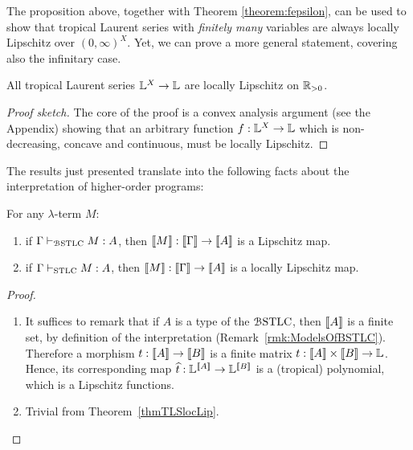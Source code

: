 The proposition above, together with Theorem \ref{theorem:fepsilon}, can be used to show that tropical Laurent series with \emph{finitely many} variables are always locally Lipschitz over $(0,\infty)^{X}$. Yet, we can prove a more general statement, covering also the infinitary case.


\begin{theorem}\label{thmTLSlocLip}
 All tropical Laurent series $\mathbb{L}^X\to\mathbb{L}$ are locally Lipschitz on $\mathbb{R}_{>0}$.
\end{theorem}
\begin{proof}[Proof sketch]
The core of the proof is a convex analysis argument (see the Appendix) showing that an arbitrary function $f:\mathbb{L}^X\to\mathbb{L}$ which is non-decreasing, concave and continuous, must be locally Lipschitz. 
\end{proof}


The results just presented translate into the following facts about the interpretation of higher-order programs:
\begin{corollary}
For any $\lambda$-term $M$:
\begin{enumerate}
\item if $\Gamma \vdash_{\mathcal{B}\mathrm{STLC}} M:A$, then $\llbracket M\rrbracket:\llbracket\Gamma\rrbracket \to \llbracket A\rrbracket$ is a Lipschitz map.
\item if $\Gamma \vdash_{\mathrm{STLC}}M:A$, then $\llbracket M\rrbracket: \llbracket\Gamma\rrbracket \to \llbracket A\rrbracket$ is a locally Lipschitz map.
\end{enumerate}
\end{corollary} 
\begin{proof}
\begin{enumerate}
\item It suffices to remark that if $A$ is a type of the $\mathcal{B}\mathrm{STLC}$, then $\llbracket A\rrbracket$ is a finite set, by definition of the interpretation (Remark~\ref{rmk:ModelsOfBSTLC}).
Therefore a morphism $t:\llbracket A\rrbracket\to \llbracket B\rrbracket$ is a finite matrix $t: \llbracket A\rrbracket \times \llbracket B\rrbracket \to \mathbb{L}$.
Hence, its corresponding map $\widehat t:\mathbb{L}^{\llbracket A\rrbracket} \to \mathbb{L}^{\llbracket B\rrbracket}$ is a (tropical) polynomial, which is a Lipschitz functions.
\item Trivial from Theorem~\ref{thmTLSlocLip}.
\end{enumerate}
\end{proof}


